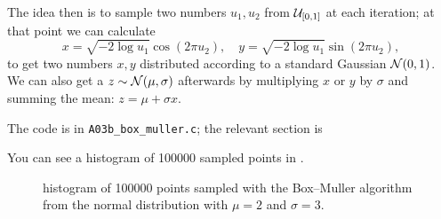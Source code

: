 The idea then is to sample two numbers $u_{1}, u_{2}$ from $\mathcal{U}_{[0, 1]}$ at each
iteration; at that point we can calculate
\begin{equation}
    x = \sqrt{-2\log u_1} \cos(2\pi u_2),
    \quad y = \sqrt{-2\log u_1} \sin(2\pi u_2),
\end{equation}
to get two numbers $x, y$ distributed according to a standard Gaussian
$\mathcal{N}(0, 1)$. We can also get a $z \sim \mathcal{N}(\mu, \sigma)$ afterwards by
multiplying $x$ or $y$ by $\sigma$ and summing the mean: $z = \mu + \sigma x$.

The code is in \texttt{A03b\_box\_muller.c}; the relevant section is

You can see a histogram of \num{100000} sampled points in .

\begin{figure}
    \centering
    
    \caption{histogram of \num{100000} points sampled with the Box–Muller
        algorithm from the normal distribution with $\mu = 2$ and $\sigma = 3$.}
    \label{fig:A03b}
\end{figure}

